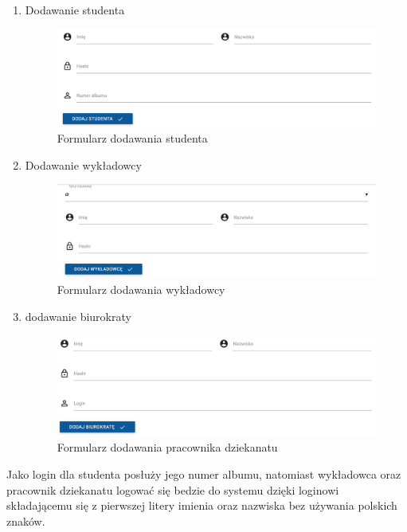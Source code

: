 \documentclass[openright]{xmgr}
\begin{document}
\begin{enumerate}

\item Dodawanie studenta

\begin{figure}[H]
\centering
\includegraphics[width=1.1\hsize]{images/addNewStudent}
\caption{Formularz dodawania studenta\label{RYS.7}}
\end{figure}

\newpage
\item Dodawanie wykładowcy

\begin{figure}[th!]
\centering
\includegraphics[width=0.9\hsize]{images/addTeacher}
\caption{Formularz dodawania wykładowcy\label{RYS.8}}
\end{figure}

\item dodawanie biurokraty

\begin{figure}[th!]
\centering
\includegraphics[width=0.7\hsize]{images/addBiurokrata}
\caption{Formularz dodawania pracownika dziekanatu\label{RYS.9}}
\end{figure}

\end{enumerate}

\noindent Jako login dla studenta posłuży jego numer albumu, natomiast wykładowca oraz pracownik dziekanatu logować się bedzie do systemu  dzięki loginowi składającemu się z pierwszej litery imienia oraz nazwiska bez używania polskich znaków.
\end{document}
